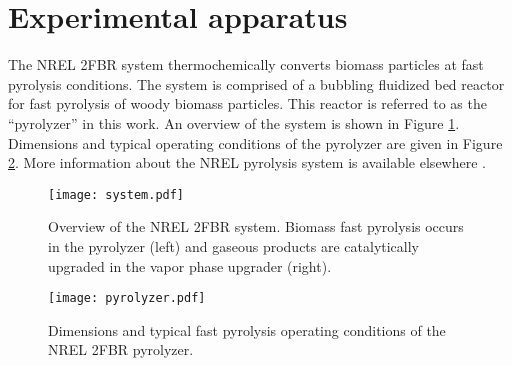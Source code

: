 
\section{Experimental apparatus}

The NREL 2FBR system thermochemically converts biomass particles at fast pyrolysis conditions. The system is comprised of a bubbling fluidized bed reactor for fast pyrolysis of woody biomass particles. This reactor is referred to as the ``pyrolyzer'' in this work. An overview of the system is shown in Figure \ref{fig:nrel-system}. Dimensions and typical operating conditions of the pyrolyzer are given in Figure \ref{fig:nrel-pyrolyzer}. More information about the NREL pyrolysis system is available elsewhere \cite{Howe-2015, Trendewicz-2015}.

\begin{figure}[H]
    \centering
    \texttt{[image: system.pdf]}
    \caption{Overview of the NREL 2FBR system. Biomass fast pyrolysis occurs in the pyrolyzer (left) and gaseous products are catalytically upgraded in the vapor phase upgrader (right).}
    \label{fig:nrel-system}
\end{figure}

\begin{figure}[H]
    \centering
    \texttt{[image: pyrolyzer.pdf]}
    \caption{Dimensions and typical fast pyrolysis operating conditions of the NREL 2FBR pyrolyzer.}
    \label{fig:nrel-pyrolyzer}
\end{figure}
